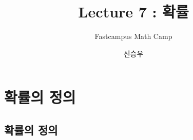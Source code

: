 \documentclass{beamer}
\title{Lecture 7 : 확률 }
\subtitle{Fastcampus Math Camp}
\author{신승우}
\begin{document}
\begin{frame}
 \titlepage
\end{frame}






\section{확률의 정의} 

\subsection{확률의 정의}
\end{document}
